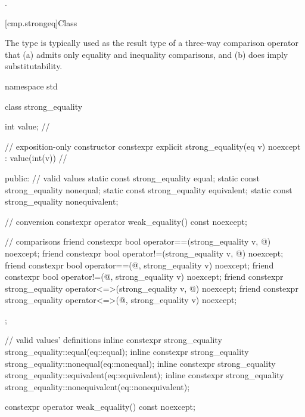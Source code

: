 \begin{itemdescr}
\pnum
\returns
{}.
\end{itemdescr}

[cmp.strongeq]{Class }

\pnum
The  type is typically used
as the result type of a three-way comparison operator
that (a) admits only equality and inequality comparisons,
and (b) does imply substitutability.

%
%
%
%
%
\begin{codeblock}
namespace std {
  class strong_equality {
    int value;  // \expos

    // exposition-only constructor
    constexpr explicit strong_equality(eq v) noexcept : value(int(v)) {}    // \expos

  public:
    // valid values
    static const strong_equality equal;
    static const strong_equality nonequal;
    static const strong_equality equivalent;
    static const strong_equality nonequivalent;

    // conversion
    constexpr operator weak_equality() const noexcept;

    // comparisons
    friend constexpr bool operator==(strong_equality v, @\unspec@) noexcept;
    friend constexpr bool operator!=(strong_equality v, @\unspec@) noexcept;
    friend constexpr bool operator==(@\unspec@, strong_equality v) noexcept;
    friend constexpr bool operator!=(@\unspec@, strong_equality v) noexcept;
    friend constexpr strong_equality operator<=>(strong_equality v, @\unspec@) noexcept;
    friend constexpr strong_equality operator<=>(@\unspec@, strong_equality v) noexcept;
  };

  // valid values' definitions
  inline constexpr strong_equality strong_equality::equal(eq::equal);
  inline constexpr strong_equality strong_equality::nonequal(eq::nonequal);
  inline constexpr strong_equality strong_equality::equivalent(eq::equivalent);
  inline constexpr strong_equality strong_equality::nonequivalent(eq::nonequivalent);
}
\end{codeblock}

%
\begin{itemdecl}
constexpr operator weak_equality() const noexcept;
\end{itemdecl}

